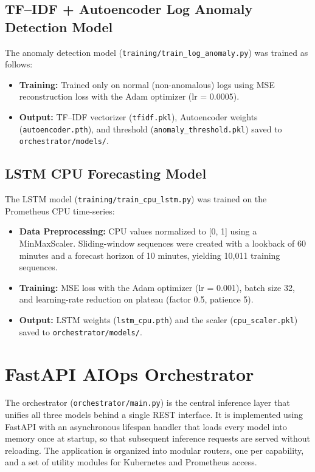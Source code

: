 \documentclass[a4paper,14pt,onecolumn]{report}
\begin{document}
\subsection{TF--IDF + Autoencoder Log Anomaly Detection Model}

The anomaly detection model (\texttt{training/train\_log\_anomaly.py}) was trained as follows:

\begin{itemize}
    \item \textbf{Training:} Trained only on normal (non-anomalous) logs using MSE reconstruction loss with the Adam optimizer (lr = 0.0005).
    \item \textbf{Output:} TF--IDF vectorizer (\texttt{tfidf.pkl}), Autoencoder weights (\texttt{autoencoder.pth}), and threshold (\texttt{anomaly\_threshold.pkl}) saved to \texttt{orchestrator/models/}.
\end{itemize}

\subsection{LSTM CPU Forecasting Model}

The LSTM model (\texttt{training/train\_cpu\_lstm.py}) was trained on the Prometheus CPU time-series:

\begin{itemize}
    \item \textbf{Data Preprocessing:} CPU values normalized to [0, 1] using a MinMaxScaler. Sliding-window sequences were created with a lookback of 60 minutes and a forecast horizon of 10 minutes, yielding 10,011 training sequences.
    \item \textbf{Training:} MSE loss with the Adam optimizer (lr = 0.001), batch size 32, and learning-rate reduction on plateau (factor 0.5, patience 5).
    \item \textbf{Output:} LSTM weights (\texttt{lstm\_cpu.pth}) and the scaler (\texttt{cpu\_scaler.pkl}) saved to \texttt{orchestrator/models/}.
\end{itemize}

\section{FastAPI AIOps Orchestrator}

The orchestrator (\texttt{orchestrator/main.py}) is the central inference layer that unifies all three models behind a single REST interface. It is implemented using FastAPI with an asynchronous lifespan handler that loads every model into memory once at startup, so that subsequent inference requests are served without reloading. The application is organized into modular routers, one per capability, and a set of utility modules for Kubernetes and Prometheus access.
\end{document}
